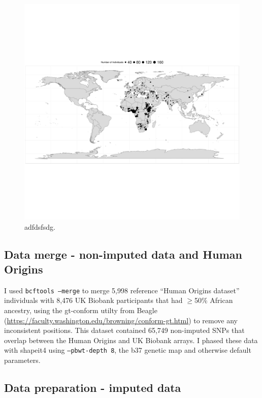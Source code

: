 \begin{figure}
    \centering
    \includegraphics[width=1.0\textwidth]{../images/chapter3/HumanOriginsMap.pdf}
    \caption{adfdsfsdg.}
    \label{fig:HumanOriginsMap}
\end{figure}

\subsection{Data merge - non-imputed data and Human Origins}

I used \texttt{bcftools --merge} to merge 5,998 reference ``Human Origins dataset'' individuals with 8,476 UK Biobank participants that had $\geq$50\% African ancestry, using the gt-conform utilty from Beagle (\url{https://faculty.washington.edu/browning/conform-gt.html}) to remove any inconsistent positions. This dataset contained 65,749 non-imputed SNPs that overlap between the Human Origins and UK Biobank arrays. I phased these data with shapeit4 \cite{delaneau2018integrative} using \texttt{--pbwt-depth 8}, the b37 genetic map and otherwise default parameters.

\subsection{Data preparation - imputed data}

